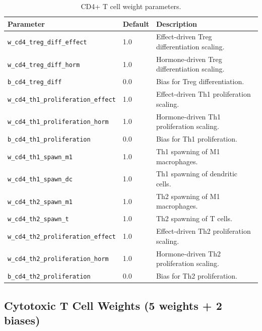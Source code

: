 \begin{table}[H]
\centering
\caption{CD4+ T cell weight parameters.}
\label{tab:cd4-weights}
\begin{tabular}{@{}llp{5.5cm}@{}}
\toprule
\textbf{Parameter} & \textbf{Default} & \textbf{Description} \\
\midrule
\texttt{w\_cd4\_treg\_diff\_effect} & 1.0 & Effect-driven Treg differentiation scaling. \\
\texttt{w\_cd4\_treg\_diff\_horm} & 1.0 & Hormone-driven Treg differentiation scaling. \\
\texttt{b\_cd4\_treg\_diff} & 0.0 & Bias for Treg differentiation. \\
\texttt{w\_cd4\_th1\_proliferation\_effect} & 1.0 & Effect-driven Th1 proliferation scaling. \\
\texttt{w\_cd4\_th1\_proliferation\_horm} & 1.0 & Hormone-driven Th1 proliferation scaling. \\
\texttt{b\_cd4\_th1\_proliferation} & 0.0 & Bias for Th1 proliferation. \\
\texttt{w\_cd4\_th1\_spawn\_m1} & 1.0 & Th1 spawning of M1 macrophages. \\
\texttt{w\_cd4\_th1\_spawn\_dc} & 1.0 & Th1 spawning of dendritic cells. \\
\texttt{w\_cd4\_th2\_spawn\_m1} & 1.0 & Th2 spawning of M1 macrophages. \\
\texttt{w\_cd4\_th2\_spawn\_t} & 1.0 & Th2 spawning of T cells. \\
\texttt{w\_cd4\_th2\_proliferation\_effect} & 1.0 & Effect-driven Th2 proliferation scaling. \\
\texttt{w\_cd4\_th2\_proliferation\_horm} & 1.0 & Hormone-driven Th2 proliferation scaling. \\
\texttt{b\_cd4\_th2\_proliferation} & 0.0 & Bias for Th2 proliferation. \\
\bottomrule
\end{tabular}
\end{table}

\subsection{Cytotoxic T Cell Weights (5 weights + 2 biases)}

